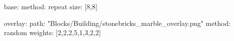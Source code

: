 base:
  method: repeat
  size: [8,8]

overlay:
  path: "Blocks/Building/stonebricks_marble_overlay.png"
  method: random
  weights: [2,2,2,5,1,3,2,2]